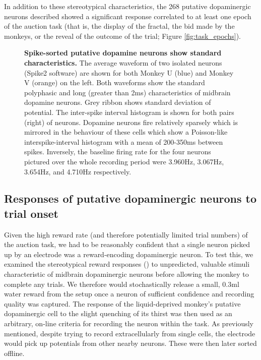 In addition to these stereotypical characteristics, the 268 putative dopaminergic neurons described showed a significant response correlated to at least one epoch of the auction task (that is, the display of the fractal, the bid made by the monkeys, or the reveal of the outcome of the trial; Figure \ref{fig:task_epochs}).

\begin{figure}[p]
\centering    

\caption[Spike-sorted putative dopamine neurons show standard characteristics.]{\textbf{Spike-sorted putative dopamine neurons show standard characteristics.} The average waveform of two isolated neurons (Spike2 software) are shown for both Monkey U (blue) and Monkey V (orange) on the left. Both waveforms show the standard polyphasic and long (greater than 2ms) characteristics of midbrain dopamine neurons. Grey ribbon shows standard deviation of potential. The inter-spike interval histogram is shown for both pairs (right) of neurons. Dopamine neurons fire relatively sparsely which is mirrored in the behaviour of these cells which show a Poisson-like interspike-interval histogram with a mean of 200-350ms between spikes. Inversely, the baseline firing rate for the four neurons pictured over the whole recording period were 3.960Hz, 3.067Hz, 3.654Hz, and 4.710Hz respectively.}
\label{fig:isi_waveforms}
\end{figure}

\subsection{Responses of putative dopaminergic neurons to trial onset}

Given the high reward rate (and therefore potentially limited trial numbers) of the auction task, we had to be reasonably confident that a single neuron picked up by an electrode was a reward-encoding dopaminergic neuron. To test this, we examined the stereotypical reward responses (\cite{mirenowiczImportanceUnpredictabilityReward1994}) to unpredicted, valuable stimuli characteristic of midbrain dopaminergic neurons before allowing the monkey to complete any trials. We therefore would stochastically release a small, 0.3ml water reward from the setup once a neuron of sufficient confidence and recording quality was captured. The response of the liquid-deprived monkey's putative dopaminergic cell to the slight quenching of its thirst was then used as an arbitrary, on-line criteria for recording the neuron within the task. As previously mentioned, despite trying to record extracellularly from single cells, the electrode would pick up potentials from other nearby neurons. These were then later sorted offline.

